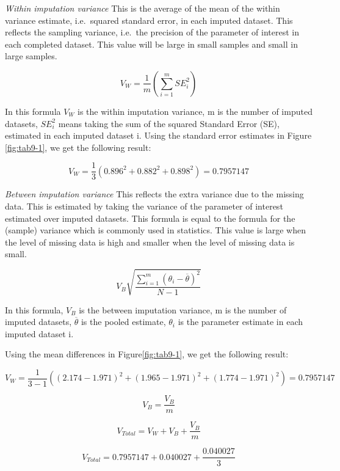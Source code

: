 \documentclass[
]{book}
\begin{document}
\emph{Within imputation variance}
This is the average of the mean of the within variance estimate, i.e.~squared standard error, in each imputed dataset. This reflects the sampling variance, i.e.~the precision of the parameter of interest in each completed dataset. This value will be large in small samples and small in large samples.

\begin{equation}
V_W = \frac{1}{m}\left (\sum_{i=1}^m{SE_i^2}\right )
  \label{eq:var-w}
\end{equation}

In this formula \(V_W\) is the within imputation variance, m is the number of imputed datasets, \(SE_i^2\) means taking the sum of the squared Standard Error (SE), estimated in each imputed dataset i. Using the standard error estimates in Figure \ref{fig:tab9-1}, we get the following result:

\[V_W = \frac{1}{3}(0.896^2 + 0.882^2 + 0.898^2)=0.7957147\]

\emph{Between imputation variance}
This reflects the extra variance due to the missing data. This is estimated by taking the variance of the parameter of interest estimated over imputed datasets. This formula is equal to the formula for the (sample) variance which is commonly used in statistics. This value is large when the level of missing data is high and smaller when the level of missing data is small.

\begin{equation}
V_B\sqrt{\frac{\sum_{i=1}^m (\theta_i - \overline{\theta})^2}{N-1} }
  \label{eq:var-b}
\end{equation}

In this formula, \(V_B\) is the between imputation variance, m is the number of imputed datasets, \(\overline{\theta}\) is the pooled estimate, \(\theta_i\) is the parameter estimate in each imputed dataset i.

Using the mean differences in Figure\ref{fig:tab9-1}, we get the following result:

\[V_W = \frac{1}{3-1}((2.174-1.971)^2+ (1.965-1.971)^2+(1.774-1.971)^2)=0.7957147\]

\[V_B = \frac{V_B}{m}\]

\begin{equation}
V_{Total} = V_W + V_B + \frac{V_B}{m}
  \label{eq:var-t}
\end{equation}

\[V_{Total} = 0.7957147+0.040027 + \frac{0.040027}{3}\]
\end{document}
